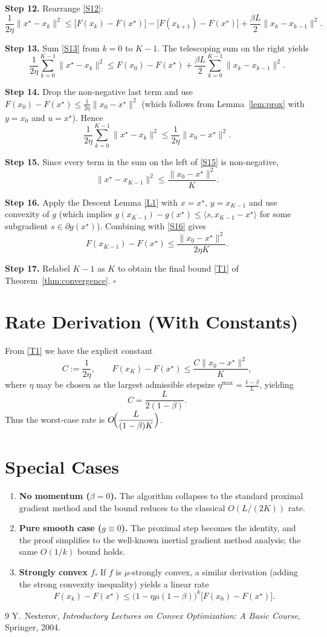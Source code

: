 \documentclass{article}
\begin{document}
\noindent\textbf{Step 12.} Rearrange \eqref{S12}:
\[
\frac{1}{2\eta}\|x^{\star}-x_k\|^{2}
\le \bigl[F(x_k)-F(x^{\star})\bigr]
-\bigl[F(x_{k+1})-F(x^{\star})\bigr]
+\frac{\beta L}{2}\|x_k-x_{k-1}\|^{2}.
\tag{S13}
\]

\noindent\textbf{Step 13.} Sum \eqref{S13} from $k=0$ to $K-1$. The telescoping sum on the right yields
\[
\frac{1}{2\eta}\sum_{k=0}^{K-1}\|x^{\star}-x_k\|^{2}
\le F(x_0)-F(x^{\star})+\frac{\beta L}{2}\sum_{k=0}^{K-1}\|x_k-x_{k-1}\|^{2}.
\tag{S14}
\]

\noindent\textbf{Step 14.} Drop the non‑negative last term and use $F(x_0)-F(x^{\star})\le \frac{1}{2\eta}\|x_0-x^{\star}\|^{2}$ (which follows from Lemma~\ref{lem:prox} with $y=x_0$ and $u=x^{\star}$). Hence
\[
\frac{1}{2\eta}\sum_{k=0}^{K-1}\|x^{\star}-x_k\|^{2}
\le \frac{1}{2\eta}\|x_0-x^{\star}\|^{2}.
\tag{S15}
\]

\noindent\textbf{Step 15.} Since every term in the sum on the left of \eqref{S15} is non‑negative,
\[
\|x^{\star}-x_{K-1}\|^{2}
\le \frac{\|x_0-x^{\star}\|^{2}}{K}.
\tag{S16}
\]

\noindent\textbf{Step 16.} Apply the Descent Lemma \eqref{L1} with $x=x^{\star}$, $y=x_{K-1}$ and use convexity of $g$ (which implies $g(x_{K-1})-g(x^{\star})\le\langle s, x_{K-1}-x^{\star}\rangle$ for some subgradient $s\in\partial g(x^{\star})$). Combining with \eqref{S16} gives
\[
F(x_{K-1})-F(x^{\star})
\le \frac{\|x_0-x^{\star}\|^{2}}{2\eta K}.
\tag{S17}
\]

\noindent\textbf{Step 17.} Relabel $K-1$ as $K$ to obtain the final bound \eqref{T1} of Theorem~\ref{thm:convergence}. $\square$

\section*{Rate Derivation (With Constants)}
From \eqref{T1} we have the explicit constant
\[
C:=\frac{1}{2\eta},\qquad 
F(x_{K})-F(x^{\star})\le \frac{C\|x_{0}-x^{\star}\|^{2}}{K},
\]
where $\eta$ may be chosen as the largest admissible stepsize $\eta^{\max}=\frac{1-\beta}{L}$, yielding
\[
C=\frac{L}{2(1-\beta)}.
\]
Thus the worst‑case rate is $\displaystyle O\!\Bigl(\frac{L}{(1-\beta)K}\Bigr)$.

\section*{Special Cases}
\begin{enumerate}
\item \textbf{No momentum ($\beta=0$).} The algorithm collapses to the standard proximal gradient method and the bound reduces to the classical $O(L/(2K))$ rate.
\item \textbf{Pure smooth case ($g\equiv0$).} The proximal step becomes the identity, and the proof simplifies to the well‑known inertial gradient method analysis; the same $O(1/k)$ bound holds.
\item \textbf{Strongly convex $f$.} If $f$ is $\mu$‑strongly convex, a similar derivation (adding the strong convexity inequality) yields a linear rate
\[
F(x_{k})-F(x^{\star})\le\bigl(1-\eta\mu(1-\beta)\bigr)^{k}\bigl[F(x_{0})-F(x^{\star})\bigr].
\]
\end{enumerate}

\begin{thebibliography}{9}
Y.~Nesterov,
\textit{Introductory Lectures on Convex Optimization: A Basic Course},
Springer, 2004.
\end{thebibliography}
\end{document}
